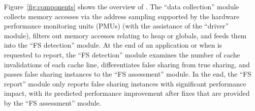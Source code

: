 
%
Figure~\ref{fig:components} shows the overview of \Cheetah{}. 
The ``data collection'' module collects memory accesses via the address sampling supported by the hardware performance monitoring units (PMUs) (with the assistance of the ``driver'' module), filters out memory accesses relating to heap or globals, and feeds them into the ``FS detection'' module. At the end of an application or when \cheetah{} is requested to report, the ``FS detection'' module examines the number of cache invalidations of each cache line, differentiates false sharing from true sharing, and passes false sharing instances to the ``FS assessment'' module. In the end, the ``FS report'' module only reports false sharing instances with significant performance impact, with its predicted performance improvement after fixes that are provided by the ``FS assessment'' module. 


